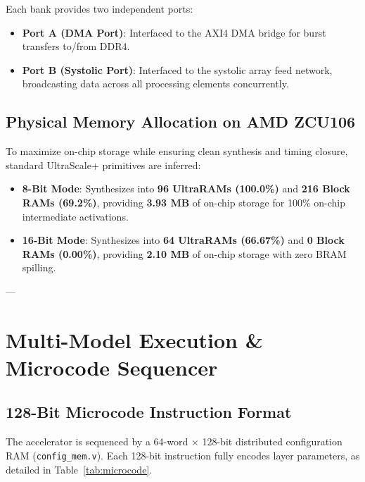 \documentclass[10pt,journal,compsoc]{IEEEtran}
\begin{document}
Each bank provides two independent ports:
\begin{itemize}
    \item \textbf{Port A (DMA Port)}: Interfaced to the AXI4 DMA bridge for burst transfers to/from DDR4.
    \item \textbf{Port B (Systolic Port)}: Interfaced to the systolic array feed network, broadcasting data across all processing elements concurrently.
\end{itemize}

\subsection{Physical Memory Allocation on AMD ZCU106}
To maximize on-chip storage while ensuring clean synthesis and timing closure, standard UltraScale+ primitives are inferred:
\begin{itemize}
    \item \textbf{8-Bit Mode}: Synthesizes into \textbf{96 UltraRAMs (100.0\%)} and \textbf{216 Block RAMs (69.2\%)}, providing \textbf{3.93 MB} of on-chip storage for 100\% on-chip intermediate activations.
    \item \textbf{16-Bit Mode}: Synthesizes into \textbf{64 UltraRAMs (66.67\%)} and \textbf{0 Block RAMs (0.00\%)}, providing \textbf{2.10 MB} of on-chip storage with zero BRAM spilling.
\end{itemize}

---

\section{Multi-Model Execution \& Microcode Sequencer}

\subsection{128-Bit Microcode Instruction Format}
The accelerator is sequenced by a 64-word $\times$ 128-bit distributed configuration RAM (\texttt{config\_mem.v}). Each 128-bit instruction fully encodes layer parameters, as detailed in Table~\ref{tab:microcode}.
\end{document}
